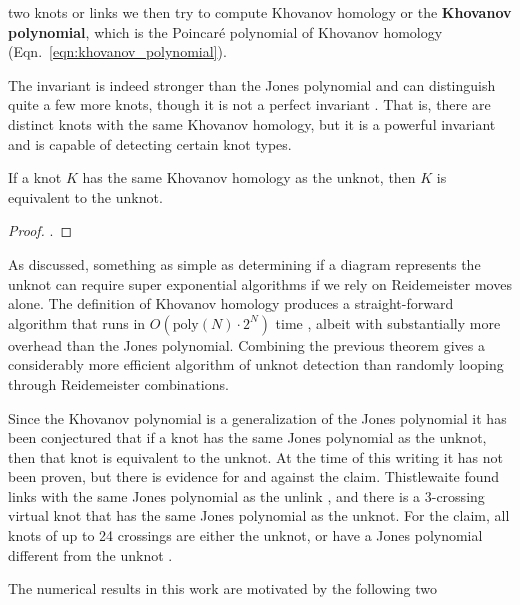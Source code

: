     two knots or links we then try to compute Khovanov homology or the
    \textbf{Khovanov polynomial}, which is the Poincar\'{e} polynomial of
    Khovanov homology (Eqn.~\ref{eqn:khovanov_polynomial}).
    \par\hfill\par
    The invariant is indeed stronger than the Jones polynomial and can
    distinguish quite a few more knots, though it is not a perfect
    invariant \cite{Watson2007KnotsWI}. That is, there are
    distinct knots with the same Khovanov homology, but it is a powerful
    invariant and is capable of detecting certain knot types.
    \begin{theorem}
        If a knot $K$ has the same Khovanov homology as the unknot, then $K$
        is equivalent to the unknot.
    \end{theorem}
    \begin{proof}
        \cite{KronheimerMrowka2011KhovanovUnknot}.
    \end{proof}
    As discussed, something as simple as determining if a diagram represents
    the unknot can require super exponential algorithms if we rely on
    Reidemeister moves alone. The definition of Khovanov homology produces a
    straight-forward algorithm that runs in
    $O(\textrm{poly}(N)\cdot{2}^{N})$ time \cite{BarNatanKhovanovJones},
    albeit with substantially more overhead than the Jones polynomial.
    Combining the previous theorem gives a considerably more efficient
    algorithm of unknot detection than randomly looping through
    Reidemeister combinations.
    \par\hfill\par
    Since the Khovanov polynomial is a generalization of
    the Jones polynomial it has been conjectured that if a
    knot has the same Jones polynomial as the unknot, then that knot is
    equivalent to the unknot. At the time of this writing it has not been
    proven, but there is evidence for and against the claim.
    Thistlewaite found links with the same Jones polynomial as the unlink
    \cite{Thistlethwaite2001LINKSWT}, and there is a 3-crossing virtual
    knot that has the same Jones polynomial as the unknot. For the claim,
    all knots of up to 24 crossings are either the unknot, or have a
    Jones polynomial different from the unknot
    \cite{VerificationUnknotJonesConjUpTo24}.
    \par\hfill\par
    The numerical results in this work are motivated by the following two
